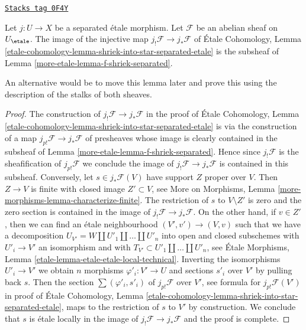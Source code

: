 \begin{lemma}
\label{more-etale-lemma-separated-etale-shriek}
\href{https://stacks.math.columbia.edu/tag/0F4Y}{\texttt{Stacks tag 0F4Y}}

Let $j : U \to X$ be a separated \'etale morphism. Let $\mathcal{F}$
be an abelian sheaf on $U_\etale$. The image of the injective map
$j_!\mathcal{F} \to j_*\mathcal{F}$ of
\'Etale Cohomology, Lemma
\ref{etale-cohomology-lemma-shriek-into-star-separated-etale}
is the subsheaf of Lemma \ref{more-etale-lemma-f-shriek-separated}.
\end{lemma}

An alternative would be to move this lemma later and prove this
using the description of the stalks of both sheaves.

\begin{proof}
The construction of $j_!\mathcal{F} \to j_*\mathcal{F}$ in the proof of
\'Etale Cohomology, Lemma
\ref{etale-cohomology-lemma-shriek-into-star-separated-etale}
is via the construction of a map
$j_{p!}\mathcal{F} \to j_*\mathcal{F}$ of presheaves
whose image is clearly contained in the subsheaf of
Lemma \ref{more-etale-lemma-f-shriek-separated}.
Hence since $j_!\mathcal{F}$ is the sheafification of
$j_{p!}\mathcal{F}$ we conclude the image of
$j_!\mathcal{F} \to j_*\mathcal{F}$ is contained in
this subsheaf. Conversely, let $s \in j_*\mathcal{F}(V)$
have support $Z$ proper over $V$. Then $Z \to V$ is
finite with closed image $Z' \subset V$, see
More on Morphisms, Lemma \ref{more-morphisms-lemma-characterize-finite}.
The restriction of $s$ to $V \setminus Z'$ is zero and the zero section is
contained in the image of $j_!\mathcal{F} \to j_*\mathcal{F}$.
On the other hand, if $v \in Z'$, then we can find
an \'etale neighbourhood
$(V', v') \to (V, v)$ such that we have a decomposition
$U_{V'} = W \amalg U'_1 \amalg \ldots \amalg U'_n$
into open and closed subschemes with $U'_i \to V'$ an isomorphism
and with $T_{V'} \subset U'_1 \amalg \ldots \amalg U'_n$, see
\'Etale Morphisms, Lemma \ref{etale-lemma-etale-etale-local-technical}.
Inverting the isomorphisms $U'_i \to V'$
we obtain $n$ morphisms $\varphi'_i : V' \to U$
and sections $s'_i$ over $V'$ by pulling back $s$.
Then the section $\sum (\varphi'_i, s'_i)$ of
$j_{p!}\mathcal{F}$ over $V'$, see formula for $j_{p!}\mathcal{F}(V')$
in proof of \'Etale Cohomology, Lemma
\ref{etale-cohomology-lemma-shriek-into-star-separated-etale},
maps to the restriction of $s$ to $V'$ by construction.
We conclude that $s$ is \'etale locally in the image
of $j_!\mathcal{F} \to j_*\mathcal{F}$ and the proof is complete.
\end{proof}

